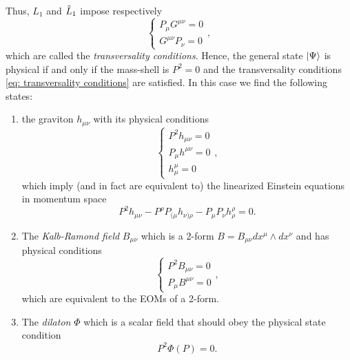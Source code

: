 Thus, $L_1$ and $\tilde{L}_1$ impose respectively 
\begin{equation}
\label{eq: transversality conditions}
    \begin{cases}
        P_\mu G^{\mu\nu} = 0 \\
        G^{\mu\nu}P_\nu = 0
    \end{cases},
\end{equation}
which are called the \emph{transversality conditions}. Hence, the general state $\ket{\Psi}$ is physical if and only if the mass-shell is $P^2 = 0$ and the transversality conditions \eqref{eq: transversality conditions} are satisfied. In this case we find the following states:
\begin{enumerate}
    \item the graviton $h_{\mu\nu}$ with its physical conditions
    \begin{equation}
        \begin{cases}
            P^2h_{\mu\nu} = 0 \\
            P_\mu h^{\mu\nu} = 0 \\
            h^\mu_\mu = 0
        \end{cases},
    \end{equation}
    which imply (and in fact are equivalent to) the linearized Einstein equations in momentum space 
    \begin{equation}
        P^2h_{\mu\nu} - P^\rho P_{(\mu}h_{\nu)\rho} - P_\mu P_\nu h^\rho_\rho = 0.
    \end{equation}
    \item The \emph{Kalb-Ramond field} $B_{\mu\nu}$ which is a 2-form $B = B_{\mu\nu}dx^\mu \wedge dx^\nu$ and has physical conditions 
    \begin{equation}
        \begin{cases}
            P^2B_{\mu\nu} = 0 \\
            P_\mu B^{\mu\nu} = 0
        \end{cases},
    \end{equation}
    which are equivalent to the EOMs of a 2-form.
    \item The \emph{dilaton} $\Phi$ which is a scalar field that should obey the physical state condition
    \begin{equation}
        P^2\Phi(P) = 0.
    \end{equation}
\end{enumerate}


